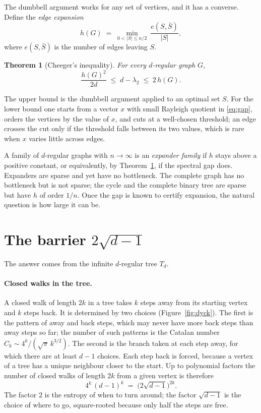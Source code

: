 \documentclass[11pt,letterpaper]{article}
\newtheorem{theorem}{Theorem}
\theoremstyle{definition}
\theoremstyle{remark}
\newcommand{\edge}{2\sqrt{d-1}}
\begin{document}
The dumbbell argument works for any set of vertices, and it has a converse. Define the
\emph{edge expansion}
\[
  h(G)\;=\;\min_{0<|S|\le n/2}\ \frac{e(S,\bar S)}{|S|},
\]
where $e(S,\bar S)$ is the number of edges leaving $S$.

\begin{theorem}[Cheeger's inequality]\label{thm:cheeger}
For every $d$-regular graph $G$,
\[
  \frac{h(G)^2}{2d}\;\le\;d-\lambda_2\;\le\;2\,h(G).
\]
\end{theorem}

The upper bound is the dumbbell argument applied to an optimal set $S$. For the lower bound one
starts from a vector $x$ with small Rayleigh quotient in \eqref{eq:gap}, orders the vertices by
the value of $x$, and cuts at a well-chosen threshold; an edge crosses the cut only if the
threshold falls between its two values, which is rare when $x$ varies little across edges.

A family of $d$-regular graphs with $n\to\infty$ is an \emph{expander family} if $h$ stays above
a positive constant, or equivalently, by Theorem~\ref{thm:cheeger}, if the spectral gap does.
Expanders are sparse and yet have no bottleneck. The complete graph has no bottleneck but is not
sparse; the cycle and the complete binary tree are sparse but have $h$ of order $1/n$. Once the
gap is known to certify expansion, the natural question is how large it can be.

\section{The barrier \texorpdfstring{$\edge$}{2 sqrt(d-1)}}

The answer comes from the infinite $d$-regular tree $T_d$.

\paragraph{Closed walks in the tree.}
A closed walk of length $2k$ in a tree takes $k$ steps away from its starting vertex and $k$
steps back. It is determined by two choices (Figure~\ref{fig:dyck}). The first is the pattern of
away and back steps, which may never have more back steps than away steps so far; the number of
such patterns is the Catalan number $C_k\sim 4^k/(\sqrt{\pi}\,k^{3/2})$. The second is the branch
taken at each step away, for which there are at least $d-1$ choices. Each step back is forced,
because a vertex of a tree has a unique neighbour closer to the start. Up to polynomial factors
the number of closed walks of length $2k$ from a given vertex is therefore
\[
  4^k\,(d-1)^k\;=\;\bigl(\edge\bigr)^{2k}.
\]
The factor $2$ is the entropy of when to turn around; the factor $\sqrt{d-1}$ is the choice of
where to go, square-rooted because only half the steps are free.
\end{document}
